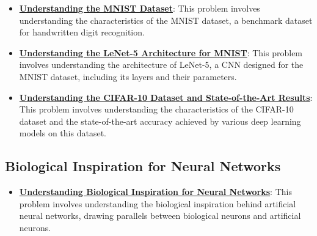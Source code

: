 \documentclass{article}%
\begin{document}
\begin{itemize}[leftmargin=*]
\item \href{https://purdue.brightspace.com/d2l/common/assets/pdfjs-d2l-dist/1.0.14-legacy/web/viewer.html?file=\%2Fcontent\%2Fenforced\%2F1095467-wl.202510.CS.24300.001\%2F09L1-cnn.pdf\%3Fou\%3D1095467\&lang=en-us\&container=d2l-fileviewer-rendered-pdf\&fullscreen=d2l-fileviewer-rendered-pdf-dialog\&height=667#page=21}{\textbf{Understanding the MNIST Dataset}}: This problem involves understanding the characteristics of the MNIST dataset, a benchmark dataset for handwritten digit recognition.%
\item \href{https://purdue.brightspace.com/d2l/common/assets/pdfjs-d2l-dist/1.0.14-legacy/web/viewer.html?file=\%2Fcontent\%2Fenforced\%2F1095467-wl.202510.CS.24300.001\%2F09L1-cnn.pdf\%3Fou\%3D1095467\&lang=en-us\&container=d2l-fileviewer-rendered-pdf\&fullscreen=d2l-fileviewer-rendered-pdf-dialog\&height=667#page=22}{\textbf{Understanding the LeNet-5 Architecture for MNIST}}: This problem involves understanding the architecture of LeNet-5, a CNN designed for the MNIST dataset, including its layers and their parameters.%
\item \href{https://purdue.brightspace.com/d2l/common/assets/pdfjs-d2l-dist/1.0.14-legacy/web/viewer.html?file=\%2Fcontent\%2Fenforced\%2F1095467-wl.202510.CS.24300.001\%2F09L1-cnn.pdf\%3Fou\%3D1095467\&lang=en-us\&container=d2l-fileviewer-rendered-pdf\&fullscreen=d2l-fileviewer-rendered-pdf-dialog\&height=667#page=23}{\textbf{Understanding the CIFAR-10 Dataset and State-of-the-Art Results}}: This problem involves understanding the characteristics of the CIFAR-10 dataset and the state-of-the-art accuracy achieved by various deep learning models on this dataset.%
\end{itemize}

%
\subsection{Biological Inspiration for Neural Networks}%
\label{subsec:BiologicalInspirationforNeuralNetworks}%
\begin{itemize}[leftmargin=*]%
\item \href{https://purdue.brightspace.com/d2l/common/assets/pdfjs-d2l-dist/1.0.14-legacy/web/viewer.html?file=\%2Fcontent\%2Fenforced\%2F1095467-wl.202510.CS.24300.001\%2F09L1-cnn.pdf\%3Fou\%3D1095467\&lang=en-us\&container=d2l-fileviewer-rendered-pdf\&fullscreen=d2l-fileviewer-rendered-pdf-dialog\&height=667#page=20}{\textbf{Understanding Biological Inspiration for Neural Networks}}: This problem involves understanding the biological inspiration behind artificial neural networks, drawing parallels between biological neurons and artificial neurons.%
\end{itemize}
\end{document}
